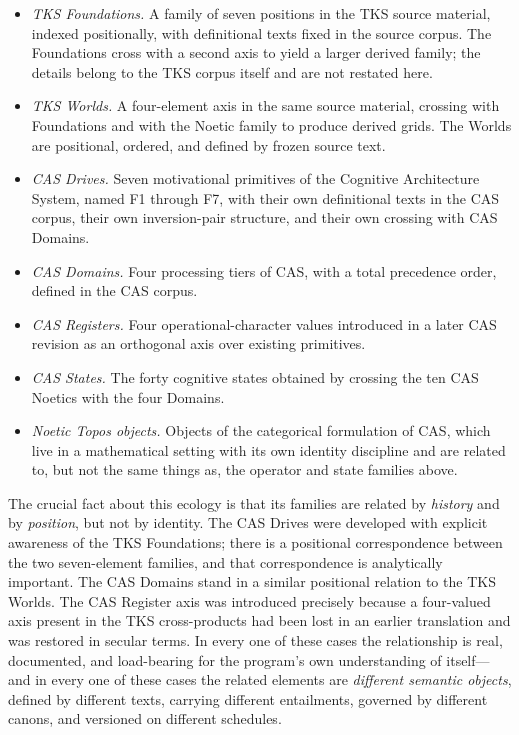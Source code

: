 \begin{itemize}
\item \emph{TKS Foundations.} A family of seven positions in the TKS source
material, indexed positionally, with definitional texts fixed in the source
corpus. The Foundations cross with a second axis to yield a larger derived
family; the details belong to the TKS corpus itself and are not restated
here.
\item \emph{TKS Worlds.} A four-element axis in the same source material,
crossing with Foundations and with the Noetic family to produce derived
grids. The Worlds are positional, ordered, and defined by frozen source
text.
\item \emph{CAS Drives.} Seven motivational primitives of the Cognitive
Architecture System, named F1 through F7, with their own definitional texts
in the CAS corpus, their own inversion-pair structure, and their own
crossing with CAS Domains.
\item \emph{CAS Domains.} Four processing tiers of CAS, with a total
precedence order, defined in the CAS corpus.
\item \emph{CAS Registers.} Four operational-character values introduced in
a later CAS revision as an orthogonal axis over existing primitives.
\item \emph{CAS States.} The forty cognitive states obtained by crossing
the ten CAS Noetics with the four Domains.
\item \emph{Noetic Topos objects.} Objects of the categorical formulation
of CAS, which live in a mathematical setting with its own identity
discipline and are related to, but not the same things as, the operator and
state families above.
\end{itemize}

The crucial fact about this ecology is that its families are related by
\emph{history} and by \emph{position}, but not by identity. The CAS Drives
were developed with explicit awareness of the TKS Foundations; there is a
positional correspondence between the two seven-element families, and that
correspondence is analytically important. The CAS Domains stand in a
similar positional relation to the TKS Worlds. The CAS Register axis was
introduced precisely because a four-valued axis present in the TKS
cross-products had been lost in an earlier translation and was restored in
secular terms. In every one of these cases the relationship is real,
documented, and load-bearing for the program's own understanding of
itself---and in every one of these cases the related elements are
\emph{different semantic objects}, defined by different texts, carrying
different entailments, governed by different canons, and versioned on
different schedules.

